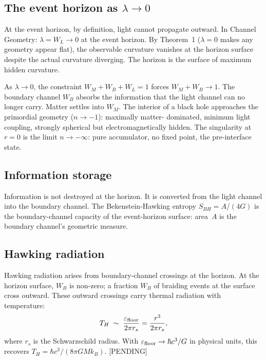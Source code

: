 \documentclass[prd,twocolumn,preprintnumbers,amsmath,amssymb]{revtex4-2}
\newcommand{\pending}{\textcolor{red!70!black}{[PENDING]}}
\newcommand{\WL}{W_{L}}
\newcommand{\WB}{W_{B}}
\newcommand{\WM}{W_{M}}
\begin{document}
\subsection{The event horizon as $\lambda\to 0$}

At the event horizon, by definition, light cannot propagate outward.  In Channel
Geometry: $\lambda = \WL \to 0$ at the event horizon.  By Theorem~1
($\lambda=0$ makes any geometry appear flat), the observable curvature vanishes
at the horizon surface despite the actual curvature diverging.  The horizon is
the surface of maximum hidden curvature.

As $\lambda\to 0$, the constraint $\WM + \WB + \WL = 1$ forces $\WM + \WB
\to 1$.  The boundary channel $\WB$ absorbs the information that the light
channel can no longer carry.  Matter settles into $\WM$.  The interior of a
black hole approaches the primordial geometry ($n\to-1$): maximally matter-
dominated, minimum light coupling, strongly spherical but electromagnetically
hidden.  The singularity at $r=0$ is the limit $n\to-\infty$: pure accumulator,
no fixed point, the pre-interface state.

\subsection{Information storage}

Information is not destroyed at the horizon.  It is converted from the light
channel into the boundary channel.  The Bekenstein-Hawking entropy $S_{BH} =
A/(4G)$ is the boundary-channel capacity of the event-horizon surface: area~$A$
is the boundary channel's geometric measure.

\subsection{Hawking radiation}

Hawking radiation arises from boundary-channel crossings at the horizon.  At
the horizon surface, $\WB$ is non-zero; a fraction $\WB$ of braiding events at
the surface cross outward.  These outward crossings carry thermal radiation with
temperature:
\begin{equation}
  T_H \;\sim\; \frac{\varepsilon_{\rm floor}}{2\pi r_s} = \frac{r^3}{2\pi r_s},
  \label{eq:TH}
\end{equation}
where $r_s$ is the Schwarzschild radius.  With $\varepsilon_{\rm floor} \to
\hbar c^3/G$ in physical units, this recovers $T_H = \hbar c^3/(8\pi G M k_B)$.
\pending
\end{document}
